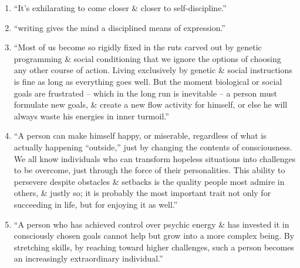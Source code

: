 \documentclass{article}
\numberwithin{equation}{section}
\begin{document}
\begin{enumerate}
	\item ``It's exhilarating to come closer \& closer to self-discipline.''
	\item ``writing gives the mind a disciplined means of expression.''
	\item ``Most of us become so rigidly fixed in the ruts carved out by genetic programming \& social conditioning that we ignore the options of choosing any other course of action. Living exclusively by genetic \& social instructions is fine as long as everything goes well. But the moment biological or social goals are frustrated -- which in the long run is inevitable -- a person must formulate new goals, \& create a new flow activity for himself, or else he will always waste his energies in inner turmoil.''
	\item ``A person can make himself happy, or miserable, regardless of what is actually happening ``outside,'' just by changing the contents of consciousness. We all know individuals who can transform hopeless situations into challenges to be overcome, just through the force of their personalities. This ability to persevere despite obstacles \& setbacks is the quality people most admire in others, \& justly so; it is probably the most important trait not only for succeeding in life, but for enjoying it as well.''
	\item ``A person who has achieved control over psychic energy \& has invested it in consciously chosen goals cannot help but grow into a more complex being. By stretching skills, by reaching toward higher challenges, such a person becomes an increasingly extraordinary individual.''
\end{enumerate}


\printbibliography[heading=bibintoc]
	
\end{document}
